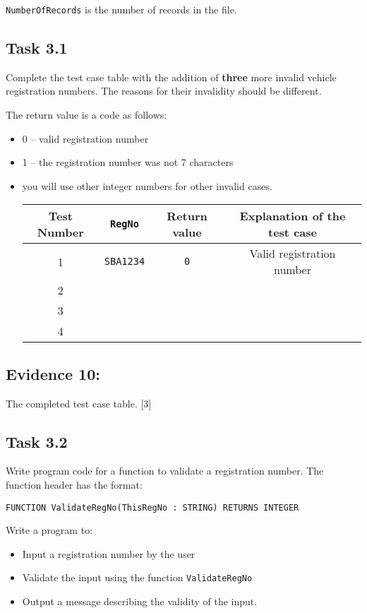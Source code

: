 \texttt{NumberOfRecords} is the number of records in the file.

\subsection*{Task 3.1 }

Complete the test case table with the addition of \textbf{three} more
invalid vehicle registration numbers. The reasons for their invalidity
should be different.

The return value is a code as follows: 
\begin{itemize}
\item 0 -- valid registration number 
\item 1 -- the registration number was not 7 characters 
\item you will use other integer numbers for other invalid cases.

\begin{tabular}{|c|c|c|c|}
\hline 
Test Number & \texttt{RegNo} & Return value & Explanation of the test case\tabularnewline
\hline 
1 & \texttt{SBA1234} & \texttt{0} & Valid registration number\tabularnewline
\hline 
2 &  &  & \tabularnewline
\hline 
3 &  &  & \tabularnewline
\hline 
4 &  &  & \tabularnewline
\hline 
\end{tabular}
\end{itemize}

\subsection*{Evidence 10: }

The completed test case table. \hfill{}{[}3{]}

\subsection*{Task 3.2 }

Write program code for a function to validate a registration number.
The function header has the format:
\noindent \begin{center}
\texttt{FUNCTION ValidateRegNo(ThisRegNo : STRING) RETURNS INTEGER }
\par\end{center}

Write a program to:
\begin{itemize}
\item Input a registration number by the user 
\item Validate the input using the function \texttt{ValidateRegNo} 
\item Output a message describing the validity of the input.
\end{itemize}

